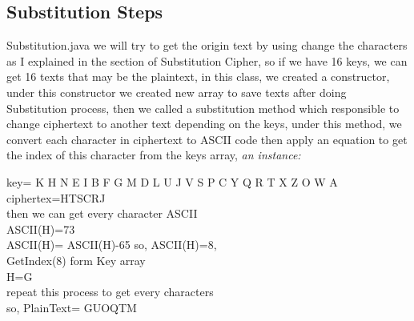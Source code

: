 \subsection{Substitution Steps}
Substitution.java we will try to get the origin text by using change the  characters as I explained in the section of Substitution Cipher, so if we have 16 keys, we can get 16 texts that may be the plaintext, in this class, we created a constructor, under this constructor we created  new array to save texts after doing Substitution process, then we called a substitution method which responsible to change ciphertext to another text depending on the keys,
under this method, we convert each character in ciphertext to ASCII code then apply an equation to get the index of this character from the keys array,  \textit{an instance:}
\begin{tcolorbox}[breakable,notitle,boxrule=0pt,colback=blue!20,colframe=blue!20]
    {key= K H N E I B F G M D L U J V S P C Y Q R T X Z O  W  A\\
    ciphertex=HTSCRJ\\
    then we can get every character ASCII\\
    ASCII(H)=73\\
    ASCII(H)= ASCII(H)-65 so, ASCII(H)=8,\\
    GetIndex(8) form Key array\\
    H=G\\
    repeat this process to get every characters\\
    so, PlainText= GUOQTM
     }
    \end{tcolorbox}


